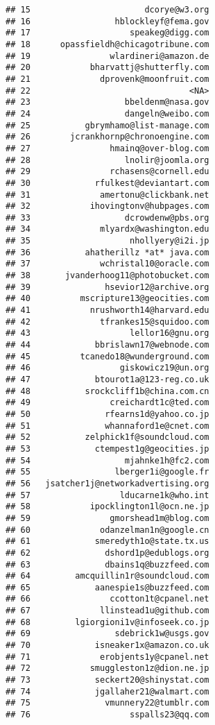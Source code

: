 \documentclass[]{article}
\begin{document}
\begin{verbatim}
## 15                       dcorye@w3.org
## 16                 hblockleyf@fema.gov
## 17                    speakeg@digg.com
## 18      opassfieldh@chicagotribune.com
## 19                wlardineri@amazon.de
## 20            bharvattj@shutterfly.com
## 21              dprovenk@moonfruit.com
## 22                                <NA>
## 23                   bbeldenm@nasa.gov
## 24                   dangeln@weibo.com
## 25           gbrymhamo@list-manage.com
## 26        jcrankhornp@chronoengine.com
## 27                hmainq@over-blog.com
## 28                   lnolir@joomla.org
## 29                rchasens@cornell.edu
## 30             rfulkest@deviantart.com
## 31              amertonu@clickbank.net
## 32            ihovingtonv@hubpages.com
## 33                   dcrowdenw@pbs.org
## 34              mlyardx@washington.edu
## 35                    nhollyery@i2i.jp
## 36           ahatherillz *at* java.com
## 37              wchristal10@oracle.com
## 38       jvanderhoog11@photobucket.com
## 39               hsevior12@archive.org
## 40          mscripture13@geocities.com
## 41            nrushworth14@harvard.edu
## 42              tfrankes15@squidoo.com
## 43                    lellor16@gnu.org
## 44             bbrislawn17@webnode.com
## 45          tcanedo18@wunderground.com
## 46                  giskowicz19@un.org
## 47             btourot1a@123-reg.co.uk
## 48           srockcliff1b@china.com.cn
## 49                creichardt1c@ted.com
## 50               rfearns1d@yahoo.co.jp
## 51               whannaford1e@cnet.com
## 52           zelphick1f@soundcloud.com
## 53             ctempest1g@geocities.jp
## 54                   mjahnke1h@fc2.com
## 55                 lberger1i@google.fr
## 56   jsatcher1j@networkadvertising.org
## 57                  lducarne1k@who.int
## 58            ipocklington1l@ocn.ne.jp
## 59                gmorshead1m@blog.com
## 60              odanzelman1n@google.cn
## 61             smeredyth1o@state.tx.us
## 62               dshord1p@edublogs.org
## 63               dbains1q@buzzfeed.com
## 64         amcquillin1r@soundcloud.com
## 65             aanespie1s@buzzfeed.com
## 66                ccotton1t@cpanel.net
## 67              llinstead1u@github.com
## 68         lgiorgioni1v@infoseek.co.jp
## 69                 sdebrick1w@usgs.gov
## 70             isneaker1x@amazon.co.uk
## 71              erobjents1y@cpanel.net
## 72            smuggleston1z@dion.ne.jp
## 73             seckert20@shinystat.com
## 74             jgallaher21@walmart.com
## 75               vmunnery22@tumblr.com
## 76                    sspalls23@qq.com

\end{verbatim}
\end{document}
